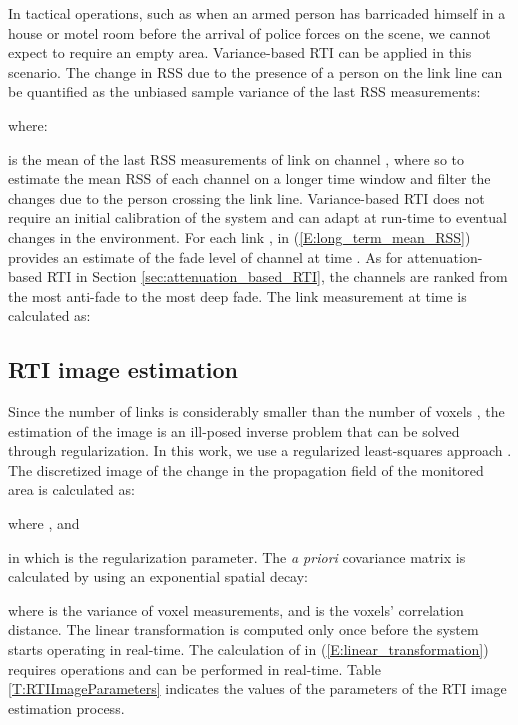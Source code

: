\documentclass[conference]{IEEEtran}
\begin{document}
In tactical operations, such as when an armed person has barricaded
himself in a house or motel room before the arrival of police forces
on the scene, we cannot expect to require an empty
area. Variance-based RTI can be applied in this scenario. The change
in RSS due to the presence of a person on the link line can be
quantified as the unbiased sample variance of the last  RSS
measurements:

where:

is the mean of the last  RSS measurements of link  on
channel , where  so to estimate the mean RSS of each
channel on a longer time window and filter the changes due to the
person crossing the link line. Variance-based RTI does not require an
initial calibration of the system and can adapt at run-time to
eventual changes in the environment. For each link , 
in (\ref{E:long_term_mean_RSS}) provides an estimate of the fade level
of channel  at time . As for attenuation-based RTI in Section
\ref{sec:attenuation_based_RTI}, the channels are ranked from the most
anti-fade to the most deep fade. The link measurement  at time
 is calculated as:




\subsection{RTI image estimation} \label{sec:RTI_image_est} Since the
number of links  is considerably smaller than the number of voxels
, the estimation of the image  is an ill-posed inverse
problem that can be solved through regularization. In this work, we
use a regularized least-squares approach
\cite{Patwari_corr_shadow_2008,Zhao_SECON_2011,MASS,Grandma_2012}. The
discretized image of the change in the propagation field of the
monitored area is calculated as:

where , and

in which  is the regularization parameter. The \emph{a
  priori} covariance matrix  is calculated by using an
exponential spatial decay:

where  is the variance of voxel measurements, and
 is the voxels' correlation distance. The linear
transformation  is computed only once before the system
starts operating in real-time. The calculation of 
in (\ref{E:linear_transformation}) requires  operations
and can be performed in real-time. Table \ref{T:RTIImageParameters}
indicates the values of the parameters of the RTI image estimation
process.
\end{document}
